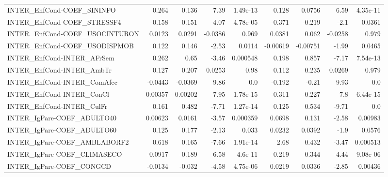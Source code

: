\begin{tabular}{lrrrrrrrr}
INTER\_EnfCond-COEF\_SININFO             &       0.264 &        0.136 &    7.39 & 1.49e-13 &      0.128 &      0.0756 &         6.59 &      4.35e-11 \\
INTER\_EnfCond-COEF\_STRESSF4            &      -0.158 &       -0.151 &   -4.07 & 4.78e-05 &     -0.371 &      -0.219 &         -2.1 &        0.0361 \\
INTER\_EnfCond-COEF\_USOCINTURON         &      0.0123 &       0.0291 & -0.0386 &    0.969 &     0.0381 &       0.062 &      -0.0258 &         0.979 \\
INTER\_EnfCond-COEF\_USODISPMOB          &       0.122 &        0.146 &   -2.53 &   0.0114 &   -0.00619 &    -0.00751 &        -1.99 &        0.0465 \\
INTER\_EnfCond-INTER\_AFrSem             &       0.262 &         0.65 &   -3.46 & 0.000548 &      0.198 &       0.857 &        -7.17 &      7.54e-13 \\
INTER\_EnfCond-INTER\_AmbTr              &       0.127 &        0.207 &  0.0253 &     0.98 &      0.112 &       0.235 &       0.0269 &         0.979 \\
INTER\_EnfCond-INTER\_ComAfec            &     -0.0443 &      -0.0369 &    9.86 &      0.0 &     -0.192 &       -0.21 &         9.93 &           0.0 \\
INTER\_EnfCond-INTER\_ConCl              &     0.00357 &      0.00202 &    7.95 & 1.78e-15 &     -0.311 &      -0.227 &          7.8 &      6.44e-15 \\
INTER\_EnfCond-INTER\_CulFr              &       0.161 &        0.482 &   -7.71 & 1.27e-14 &      0.125 &       0.534 &        -9.71 &           0.0 \\
INTER\_IgPare-COEF\_ADULTO40             &     0.00623 &       0.0161 &   -3.57 & 0.000359 &     0.0698 &       0.131 &        -2.58 &       0.00983 \\
INTER\_IgPare-COEF\_ADULTO60             &       0.125 &        0.177 &   -2.13 &    0.033 &     0.0232 &      0.0392 &         -1.9 &        0.0576 \\
INTER\_IgPare-COEF\_AMBLABORF2           &       0.618 &        0.165 &   -7.66 & 1.91e-14 &       2.68 &       0.432 &        -3.47 &      0.000513 \\
INTER\_IgPare-COEF\_CLIMASECO            &     -0.0917 &       -0.189 &   -6.58 &  4.6e-11 &     -0.219 &      -0.344 &        -4.44 &      9.08e-06 \\
INTER\_IgPare-COEF\_CONGCD               &     -0.0134 &       -0.032 &   -4.58 & 4.75e-06 &     0.0219 &      0.0336 &        -2.85 &       0.00436 \\

\end{tabular}
